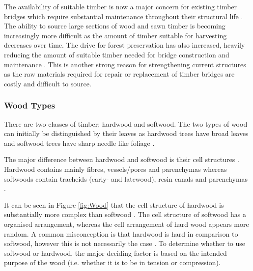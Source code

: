 \documentclass[11pt,a4paper]{article}
\numberwithin{equation}{subsection}
\begin{document}
	\vspace*{\baselineskip}
	
	\noindent
	The availability of suitable timber is now a major concern for existing timber bridges which require substantial maintenance throughout their structural life \cite{_timber_2005}. The ability to source large sections of wood and sawn timber is becoming increasingly more difficult as the amount of timber suitable for harvesting decreases over time. The drive for forest preservation has also increased, heavily reducing the amount of suitable timber needed for bridge construction and maintenance \cite{_timber_2005,ritter_timber_1990}. This is another strong reason for strengthening current structures as the raw materials required for repair or replacement of timber bridges are costly and difficult to source.
	
	\subsubsection{Wood Types}
	There are two classes of timber; hardwood and softwood. The two types of wood can initially be distinguished by their leaves as hardwood trees have broad leaves and softwood trees have sharp needle like foliage \cite{dunningham_review_2015}. 
	
	\vspace*{\baselineskip}
	
	\noindent
	The major difference between hardwood and softwood is their cell structures \cite{stalnaker_structural_2013}. Hardwood contains mainly fibres, vessels/pores and parenchymas whereas softwoods contain tracheids (early- and latewood), resin canals and parenchymas \cite{cresswell_product_2004}.
	
	\vspace*{\baselineskip}
	
	\noindent
	It can be seen in Figure \ref{fig:Wood} that the cell structure of hardwood is substantially more complex than softwood \cite{mohanty_natural_2005}. The cell structure of softwood has a organised arrangement, whereas the cell arrangement of hard wood appears more random. A common misconception is that hardwood is hard in comparison to softwood, however this is not necessarily the case \cite{pipinato_innovative_2015,marshall_black_2005}. To determine whether to use softwood or hardwood, the major deciding factor is based on the intended purpose of the wood (i.e. whether it is to be in tension or compression).
	
\end{document}
